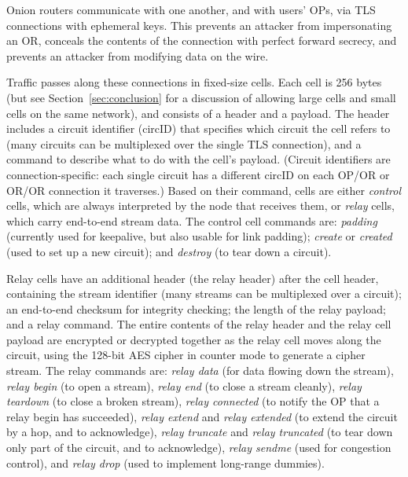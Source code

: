 \documentclass[times,10pt,twocolumn]{article}
\begin{document}
\label{subsec:cells}

Onion routers communicate with one another, and with users' OPs, via TLS
connections with ephemeral keys.  This prevents an attacker from
impersonating an OR, conceals the contents of the connection with
perfect forward secrecy, and prevents an attacker from modifying data
on the wire.

Traffic passes along these connections in fixed-size cells.  Each cell
is 256 bytes (but see Section~\ref{sec:conclusion} for a discussion of
allowing large cells and small cells on the same network), and
consists of a header and a payload. The header includes a circuit
identifier (circID) that specifies which circuit the cell refers to
(many circuits can be multiplexed over the single TLS connection), and
a command to describe what to do with the cell's payload.  (Circuit
identifiers are connection-specific: each single circuit has a different
circID on each OP/OR or OR/OR connection it traverses.)
Based on their command, cells are either \emph{control} cells, which are
always interpreted by the node that receives them, or \emph{relay} cells,
which carry end-to-end stream data.   The control cell commands are:
\emph{padding} (currently used for keepalive, but also usable for link
padding); \emph{create} or \emph{created} (used to set up a new circuit);
and \emph{destroy} (to tear down a circuit).

Relay cells have an additional header (the relay header) after the
cell header, containing the stream identifier (many streams can
be multiplexed over a circuit); an end-to-end checksum for integrity
checking; the length of the relay payload; and a relay command.  
The entire contents of the relay header and the relay cell payload 
are encrypted or decrypted together as the relay cell moves along the
circuit, using the 128-bit AES cipher in counter mode to generate a
cipher stream.
The
relay commands are: \emph{relay
data} (for data flowing down the stream), \emph{relay begin} (to open a
stream), \emph{relay end} (to close a stream cleanly), \emph{relay
teardown} (to close a broken stream), \emph{relay connected}
(to notify the OP that a relay begin has succeeded), \emph{relay
extend} and \emph{relay extended} (to extend the circuit by a hop,
and to acknowledge), \emph{relay truncate} and \emph{relay truncated}
(to tear down only part of the circuit, and to acknowledge), \emph{relay
sendme} (used for congestion control), and \emph{relay drop} (used to
implement long-range dummies).
\end{document}
